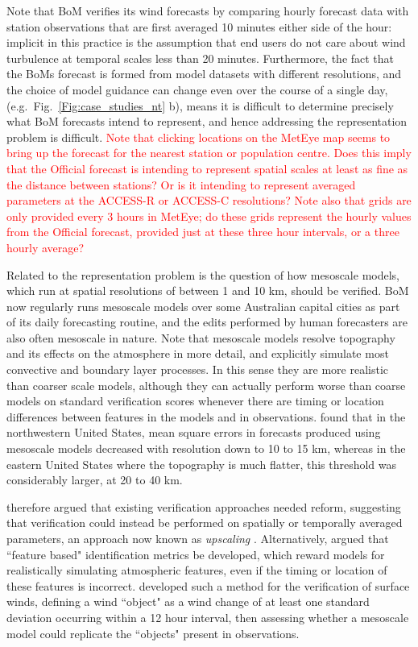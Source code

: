 \documentclass{ametsoc}
\begin{document}
Note that BoM verifies its wind forecasts by comparing hourly forecast data with station observations that are first averaged 10 minutes either side of the hour: implicit in this practice is the assumption that end users do not care about wind turbulence at temporal scales less than 20 minutes. Furthermore, the fact that the BoMs forecast is formed from model datasets with different resolutions, and the choice of model guidance can change even over the course of a single day, (e.g.~Fig.~\ref{Fig:case_studies_nt} b), means it is difficult to determine precisely what BoM forecasts intend to represent, and hence addressing the representation problem is difficult. \textcolor{red}{Note that clicking locations on the MetEye map seems to bring up the forecast for the nearest station or population centre. Does this imply that the Official forecast is intending to represent spatial scales at least as fine as the distance between stations? Or is it intending to represent averaged parameters at the ACCESS-R or ACCESS-C resolutions? Note also that grids are only provided every 3 hours in MetEye; do these grids represent the hourly values from the Official forecast, provided just at these three hour intervals, or a three hourly average?}

Related to the representation problem is the question of how mesoscale models, which run at spatial resolutions of between 1 and 10 km, should be verified. BoM now regularly runs mesoscale models over some Australian capital cities as part of its daily forecasting routine, and the edits performed by human forecasters are also often mesoscale in nature. Note that mesoscale models resolve topography and its effects on the atmosphere in more detail, and explicitly simulate most convective and boundary layer processes. In this sense they are more realistic than coarser scale models, although they can actually perform worse than coarse models on standard verification scores whenever there are timing or location differences between features in the models and in observations. \citet{mass02} found that in the northwestern United States, mean square errors in forecasts produced using mesoscale models decreased with resolution down to 10 to 15 km, whereas in the eastern United States where the topography is much flatter, this threshold was considerably larger, at 20 to 40 km. 

\citet{mass02} therefore argued that existing verification approaches needed reform, suggesting that verification could instead be performed on spatially or temporally averaged parameters, an approach now known as \textit{upscaling} \citep{ebert08}. Alternatively, \citet{mass02} argued that ``feature based" identification metrics be developed, which reward models for realistically simulating atmospheric features, even if the timing or location of these features is incorrect. \citet{rife05} developed such a method for the verification of surface winds, defining a wind ``object" as a wind change of at least one standard deviation occurring within a 12 hour interval, then assessing whether a mesoscale model could replicate the ``objects" present in observations.   
\end{document}
